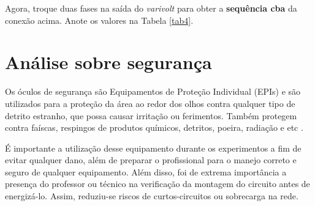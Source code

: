 \documentclass[a4paper,12pt,oneside,openany,table,xcdraw]{article}
\begin{document}
Agora, troque duas fases na saída do \textit{varivolt} para obter a \textbf{sequência cba} da conexão acima. Anote os valores na Tabela \ref{tab4}.


\begin{table}[H]\small
\centering
\def\arraystretch{1.35}
\captionsetup{font=scriptsize}
 \label{tab4}
\end{table}

\section{Análise sobre segurança} %
Os óculos de segurança são Equipamentos de Proteção Individual (EPIs) e são utilizados para a proteção da área ao redor dos olhos contra qualquer tipo de detrito estranho, que possa causar irritação ou ferimentos. Também protegem contra faíscas, respingos de produtos químicos, detritos, poeira, radiação e etc \cite{safe}.

É importante a utilização desse equipamento durante os experimentos a fim de evitar qualquer dano, além de preparar o profissional para o manejo correto e seguro de qualquer equipamento.
Além disso, foi de extrema importância a presença do professor ou técnico na verificação da montagem do circuito antes de energizá-lo. Assim, reduziu-se riscos de curtos-circuitos ou sobrecarga na rede.
\end{document}
